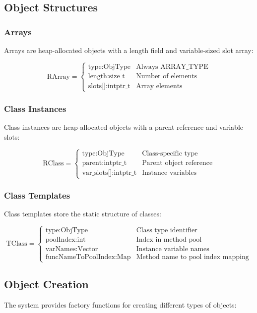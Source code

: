 \documentclass[12pt, a4paper]{article}
\begin{document}
\subsection{Object Structures}

\subsubsection{Arrays}
Arrays are heap-allocated objects with a length field and variable-sized slot array:

\[
\text{RArray} = \begin{cases}
\text{type}: \text{ObjType} & \text{Always ARRAY\_TYPE} \\
\text{length}: \text{size\_t} & \text{Number of elements} \\
\text{slots[]}: \text{intptr\_t} & \text{Array elements}
\end{cases}
\]

\subsubsection{Class Instances}
Class instances are heap-allocated objects with a parent reference and variable slots:

\[
\text{RClass} = \begin{cases}
\text{type}: \text{ObjType} & \text{Class-specific type} \\
\text{parent}: \text{intptr\_t} & \text{Parent object reference} \\
\text{var\_slots[]}: \text{intptr\_t} & \text{Instance variables}
\end{cases}
\]

\subsubsection{Class Templates}
Class templates store the static structure of classes:

\[
\text{TClass} = \begin{cases}
\text{type}: \text{ObjType} & \text{Class type identifier} \\
\text{poolIndex}: \text{int} & \text{Index in method pool} \\
\text{varNames}: \text{Vector} & \text{Instance variable names} \\
\text{funcNameToPoolIndex}: \text{Map} & \text{Method name to pool index mapping}
\end{cases}
\]

\subsection{Object Creation}
The system provides factory functions for creating different types of objects:
\end{document}
